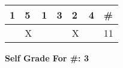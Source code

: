 \documentclass[conference]{IEEEtran}
\begin{document}
\begin{itemize}
\begin{table}[H]
	\centering
	\begin{tabular}{|l|l|l|l|l|l|l|}
		\hline
		\textbf{1} & \textbf{5} & \textbf{1} & \textbf{3} & \textbf{2} & \textbf{4} & \textbf{\#} \\ \hline
		& X &  &  & X &  & 11 \\ \hline
	\end{tabular}
\end{table}

\begin{center}
	\textbf{Self Grade For \#: 3}
\end{center}

\end{itemize}

\end{document}
